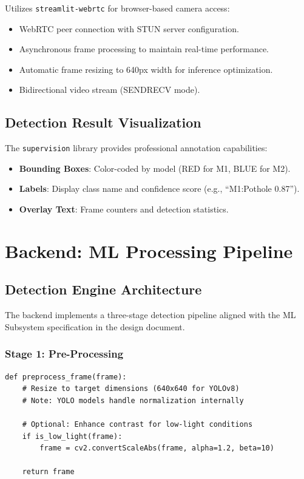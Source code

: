\documentclass[12pt]{article}
\begin{document}
Utilizes \texttt{streamlit-webrtc} for browser-based camera access:

\begin{itemize}
    \item WebRTC peer connection with STUN server configuration.
    \item Asynchronous frame processing to maintain real-time performance.
    \item Automatic frame resizing to 640px width for inference optimization.
    \item Bidirectional video stream (SENDRECV mode).
\end{itemize}

\subsection{Detection Result Visualization}

The \texttt{supervision} library provides professional annotation capabilities:

\begin{itemize}
    \item \textbf{Bounding Boxes}: Color-coded by model (RED for M1, BLUE for M2).
    \item \textbf{Labels}: Display class name and confidence score (e.g., ``M1:Pothole 0.87'').
    \item \textbf{Overlay Text}: Frame counters and detection statistics.
\end{itemize}

\clearpage

\section{Backend: ML Processing Pipeline}

\subsection{Detection Engine Architecture}

The backend implements a three-stage detection pipeline aligned with the ML Subsystem specification in the design document.

\subsubsection*{Stage 1: Pre-Processing}

\begin{lstlisting}[caption={Frame Preprocessing}, label={lst:preprocessing}]
def preprocess_frame(frame):
    # Resize to target dimensions (640x640 for YOLOv8)
    # Note: YOLO models handle normalization internally
    
    # Optional: Enhance contrast for low-light conditions
    if is_low_light(frame):
        frame = cv2.convertScaleAbs(frame, alpha=1.2, beta=10)
    
    return frame
\end{lstlisting}
\end{document}
